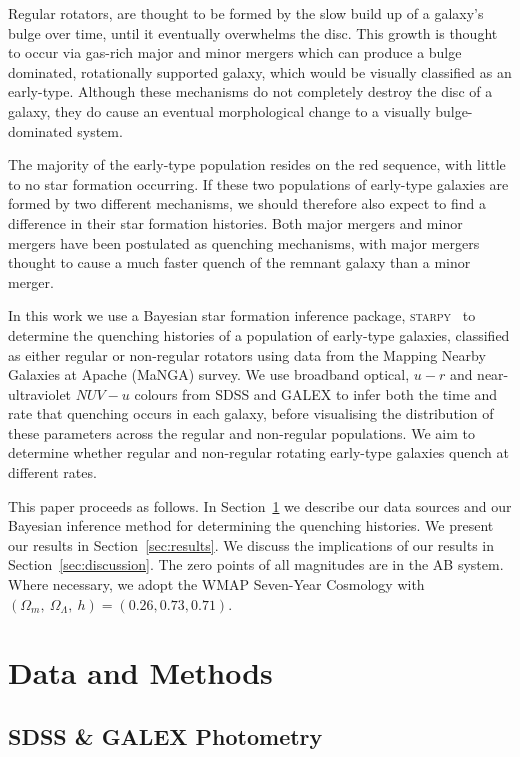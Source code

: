 \documentclass[useAMS,usenatbib]{mn2e}
\begin{document}
Regular rotators, are thought to be formed by the slow build up of a galaxy's bulge over time, until it eventually overwhelms the disc. This growth is thought to occur via gas-rich major and minor mergers \citep{duc11} which can produce a bulge dominated, rotationally supported galaxy, which would be visually classified as an early-type. Although these mechanisms do not completely destroy the disc of a galaxy, they do cause an eventual morphological change to a visually bulge-dominated system.

The majority of the early-type population resides on the red sequence, with little to no star formation occurring. If these two populations of early-type galaxies are formed by two different mechanisms, we should therefore also expect to find a difference in their star formation histories. Both major mergers and minor mergers have been postulated as quenching mechanisms, with major mergers thought to cause a much faster quench of the remnant galaxy than a minor merger. 

In this work we use a Bayesian star formation inference package, \textsc{starpy}~ to determine the quenching histories of a population of early-type galaxies, classified as either regular or non-regular rotators using data from the Mapping Nearby Galaxies at Apache (MaNGA) survey. We use broadband optical, $u-r$ and near-ultraviolet $NUV-u$ colours from SDSS and GALEX to infer both the time and rate that quenching occurs in each galaxy, before visualising the distribution of these parameters across the regular and non-regular populations. We aim to determine whether regular and non-regular rotating early-type galaxies quench at different rates. 

This paper proceeds as follows. In Section~\ref{sec:datamethods} we describe our data sources and our Bayesian inference method for determining the quenching histories. We present our results in Section~\ref{sec:results}. We discuss the implications of our results in Section~\ref{sec:discussion}. The zero points of all magnitudes are in the AB system. Where necessary, we adopt the WMAP Seven-Year Cosmology \citep{jarosik11} with $(\Omega_m , ~\Omega_\Lambda , ~h) = (0.26, 0.73, 0.71)$.



\section{Data and Methods}\label{sec:datamethods}

\subsection{SDSS \& GALEX Photometry}\label{sec:photom}
\end{document}
